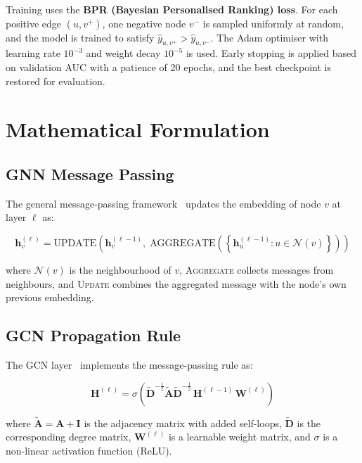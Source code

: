 \documentclass[12pt,a4paper]{article}
\begin{document}
Training uses the \textbf{BPR (Bayesian Personalised Ranking) loss}. For each positive edge $(u,v^+)$, one negative node $v^-$ is sampled uniformly at random, and the model is trained to satisfy $\hat{y}_{u,v^+} > \hat{y}_{u,v^-}$. The Adam optimiser with learning rate $10^{-3}$ and weight decay $10^{-5}$ is used. Early stopping is applied based on validation AUC with a patience of 20 epochs, and the best checkpoint is restored for evaluation.

\section{Mathematical Formulation}
\label{sec:math}

\subsection{GNN Message Passing}

The general message-passing framework~\cite{gilmer2017} updates the embedding of node $v$ at layer $\ell$ as:

\begin{equation}
\mathbf{h}_v^{(\ell)} = \text{UPDATE}\!\left(\mathbf{h}_v^{(\ell-1)},\; \text{AGGREGATE}\!\left(\left\{\mathbf{h}_u^{(\ell-1)} : u \in \mathcal{N}(v)\right\}\right)\right)
\label{eq:mp}
\end{equation}

where $\mathcal{N}(v)$ is the neighbourhood of $v$, \textsc{Aggregate} collects messages from neighbours, and \textsc{Update} combines the aggregated message with the node's own previous embedding.

\subsection{GCN Propagation Rule}

The GCN layer~\cite{kipf2017} implements the message-passing rule as:

\begin{equation}
\mathbf{H}^{(\ell)} = \sigma\!\left(\tilde{\mathbf{D}}^{-\frac{1}{2}}\tilde{\mathbf{A}}\tilde{\mathbf{D}}^{-\frac{1}{2}}\,\mathbf{H}^{(\ell-1)}\,\mathbf{W}^{(\ell)}\right)
\label{eq:gcn}
\end{equation}

where $\tilde{\mathbf{A}} = \mathbf{A} + \mathbf{I}$ is the adjacency matrix with added self-loops, $\tilde{\mathbf{D}}$ is the corresponding degree matrix, $\mathbf{W}^{(\ell)}$ is a learnable weight matrix, and $\sigma$ is a non-linear activation function (ReLU).
\end{document}
